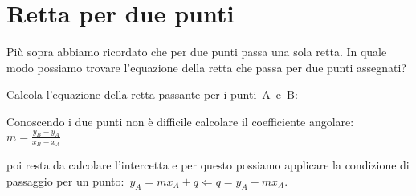 \section{Retta per due punti}
\label{sec:retta_rettaperduepunti}

Più sopra abbiamo ricordato che per due punti passa una sola retta. 
In quale modo possiamo trovare l'equazione della retta che passa per due 
punti assegnati?

\begin{procedura}
 Calcola l'equazione della retta passante per i punti~A~e~B:
 \begin{enumeratea}
  \item Conoscendo i due punti non è difficile calcolare il coefficiente 
   angolare:~\(m = \frac{y_B - y_A}{x_B - x_A}\)
  \item poi resta da calcolare l'intercetta e per questo possiamo applicare 
   la condizione di passaggio per un 
   punto:~\(y_A = m x_A + q \Leftarrow q = y_A - m x_A\).
 \end{enumeratea}
\end{procedura}


